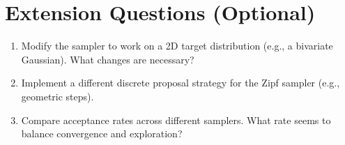 \documentclass[12pt]{article}
\begin{document}
	\section*{Extension Questions (Optional)}
	
	\begin{enumerate}[label=\textbf{E\arabic*.}]
		\item Modify the sampler to work on a 2D target distribution (e.g., a bivariate Gaussian). What changes are necessary?
		\item Implement a different discrete proposal strategy for the Zipf sampler (e.g., geometric steps).
		\item Compare acceptance rates across different samplers. What rate seems to balance convergence and exploration?
	\end{enumerate}
	
\end{document}
